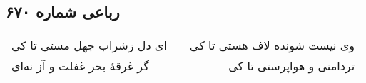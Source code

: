 \begin{center}
\section*{رباعی شماره ۶۷۰}
\label{sec:sh670}
\begin{longtable}{l p{0.5cm} r}
ای دل زشراب جهل مستی تا کی
&&
وی نیست شونده لاف هستی تا کی
\\
گر غرقهٔ بحر غفلت و آز نه‌ای
&&
تردامنی و هواپرستی تا کی
\\
\end{longtable}
\end{center}

